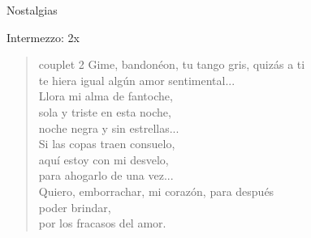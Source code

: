 \begin{song}[tango]{Nostalgias}
\begin{instrumental}{Intermezzo:}
 2x
\end{instrumental}

\begin{verse}{couplet 2}
	Gime, bandonéon, tu tango gris, quizás a ti\\
te hiera igual algún amor sentimental...\\
	Llora mi alma de fantoche,\\
	sola y triste en esta noche,\\
	noche negra y sin estrellas...\\
	Si las copas traen consuelo,\\
	aquí estoy con mi desvelo,\\
	para ahogarlo de  una vez...\hspace{\wlskip} \\
	Quiero, emborrachar, mi corazón, para después\\
	poder brindar,\\
por los fracasos del amor.
\end{verse}


\end{song}
